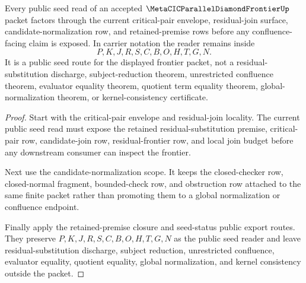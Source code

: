 \begin{theorem}
\label{thm:metacic-parallel-diamond-frontier-current-seed-public-reader}
Every public seed read of an accepted $\MetaCICParallelDiamondFrontierUp$ packet factors through the current critical-pair envelope, residual-join surface, candidate-normalization row, and retained-premise rows before any confluence-facing claim is exposed. In carrier notation the reader remains inside
$$
P,K,J,R,S,C,B,O,H,T,G,N .
$$
It is a public seed route for the displayed frontier packet, not a residual-substitution discharge, subject-reduction theorem, unrestricted confluence theorem, evaluator equality theorem, quotient term equality theorem, global-normalization theorem, or kernel-consistency certificate.
\end{theorem}
\begin{proof}
Start with the critical-pair envelope and residual-join locality. The current public seed read must expose the retained residual-substitution premise, critical-pair row, candidate-join row, residual-frontier row, and local join budget before any downstream consumer can inspect the frontier.

Next use the candidate-normalization scope. It keeps the closed-checker row, closed-normal fragment, bounded-check row, and obstruction row attached to the same finite packet rather than promoting them to a global normalization or confluence endpoint.

Finally apply the retained-premise closure and seed-status public export routes. They preserve $P,K,J,R,S,C,B,O,H,T,G,N$ as the public seed reader and leave residual-substitution discharge, subject reduction, unrestricted confluence, evaluator equality, quotient equality, global normalization, and kernel consistency outside the packet.
\end{proof}
